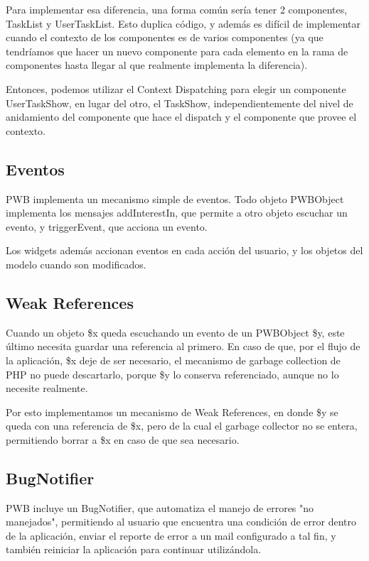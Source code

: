 Para implementar esa diferencia, una forma común sería tener 2 componentes, TaskList y UserTaskList. Esto duplica código, y además es difícil de
implementar cuando el contexto de los componentes es de varios componentes (ya que tendríamos que hacer un nuevo componente para cada elemento en
la rama de componentes hasta llegar al que realmente implementa la diferencia).

Entonces, podemos utilizar el Context Dispatching para elegir un componente UserTaskShow, en lugar del otro, el TaskShow, independientemente del nivel de
anidamiento del componente que hace el dispatch y el componente que provee el contexto.

\subsection{Eventos}

PWB implementa un mecanismo simple de eventos. Todo objeto PWBObject implementa los mensajes addInterestIn, que permite a otro objeto escuchar un evento,
y triggerEvent, que acciona un evento.

Los widgets además accionan eventos en cada acción del usuario, y los objetos del modelo cuando son modificados.

\subsection{Weak References}

Cuando un objeto \$x queda escuchando un evento de un PWBObject \$y, este último necesita guardar una referencia al primero. En caso de que, por el flujo de la
aplicación, \$x deje de ser necesario, el mecanismo de garbage collection de PHP no puede descartarlo, porque \$y lo conserva referenciado, aunque no lo
necesite realmente.

Por esto implementamos un mecanismo de Weak References, en donde \$y se queda con una referencia de \$x, pero de la cual el garbage collector no se entera,
permitiendo borrar a \$x en caso de que sea necesario.

\subsection{BugNotifier}

PWB incluye un BugNotifier, que automatiza el manejo de errores "no manejados", permitiendo al usuario que
encuentra una condición de error dentro de la aplicación, enviar el reporte de error a un mail configurado a
tal fin, y también reiniciar la aplicación para continuar utilizándola.

